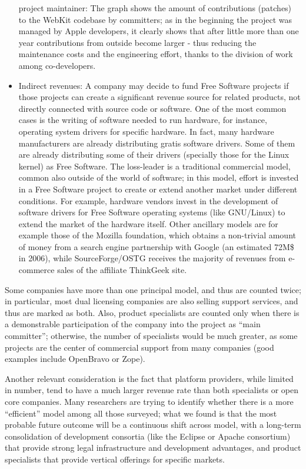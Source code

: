 \begin{itemize}
project maintainer:  The graph shows the amount of contributions
(patches) to the WebKit codebase by committers; as in the beginning the project
was managed by Apple developers, it clearly shows that after little more than
one year contributions from outside become larger - thus reducing the maintenance
costs and the engineering effort, thanks to the division of work among
co-developers.
 \item Indirect revenues: A company may decide to fund Free Software projects if
those projects can create a significant revenue source for related products, not
directly connected with source code or software. One of the most common cases is
the writing of software needed to run hardware, for instance, operating system
drivers for specific hardware. In fact, many hardware manufacturers are already
distributing gratis software drivers. Some of them are already distributing some
of their drivers (specially those for the Linux kernel) as Free Software. The
loss-leader is a traditional commercial model, common also outside of the world
of software; in this model, effort is invested in a Free Software project to
create or extend another market under different conditions. For example,
hardware vendors invest in the development of software drivers for Free Software
operating systems (like GNU/Linux) to extend the market of the hardware itself.
Other ancillary models are for example those of the Mozilla foundation, which
obtains a non-trivial amount of money from a search engine partnership with
Google (an estimated 72M\$ in 2006), while SourceForge/OSTG receives the
majority of revenues from e-commerce sales of the affiliate ThinkGeek site.
\end{itemize}

Some companies have more than one principal model, and thus are counted twice;
in particular, most dual licensing companies are also selling support services,
and thus are marked as both. Also, product specialists are counted only when
there is a demonstrable participation of the company into the project as ``main
committer''; otherwise, the number of specialists would be much greater, as some
projects are the center of commercial support from many companies (good
examples include OpenBravo or Zope).

Another relevant consideration is the fact that platform providers, while
limited in number, tend to have a much larger revenue rate than both specialists
or open core companies. Many researchers are trying to identify whether there is
a more ``efficient'' model among all those surveyed; what we found is that the
most probable future outcome will be a continuous shift across model, with a
long-term consolidation of development consortia (like the Eclipse or Apache
consortium) that provide strong legal infrastructure and development advantages,
and product specialists that provide vertical offerings for specific markets. 

